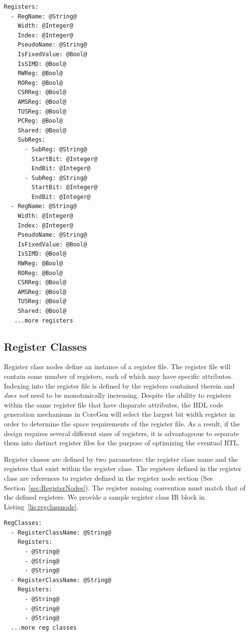 \documentclass{article}
\begin{document}
\clearpage
\vspace{0.125in}
\begin{lstlisting}[frame=single,style=base,caption={Register Node Definition},captionpos=b,label={lis:registernode}]
Registers:
  - RegName: @String@
    Width: @Integer@
    Index: @Integer@
    PseudoName: @String@
    IsFixedValue: @Bool@
    IsSIMD: @Bool@
    RWReg: @Bool@
    ROReg: @Bool@
    CSRReg: @Bool@
    AMSReg: @Bool@
    TUSReg: @Bool@
    PCReg: @Bool@
    Shared: @Bool@
    SubRegs:
      - SubReg: @String@
        StartBit: @Integer@
        EndBit: @Integer@
      - SubReg: @String@
        StartBit: @Integer@
        EndBit: @Integer@
  - RegName: @String@
    Width: @Integer@
    Index: @Integer@
    PseudoName: @String@
    IsFixedValue: @Bool@
    IsSIMD: @Bool@
    RWReg: @Bool@
    ROReg: @Bool@
    CSRReg: @Bool@
    AMSReg: @Bool@
    TUSReg: @Bool@
    Shared: @Bool@
   ...more registers
\end{lstlisting}  

\clearpage
\subsection{Register Classes}
\label{sec:RegisterClassNodes}

Register class nodes define an instance of a register file.  The register file will contain some number of registers, each of 
which may have specific attributes.  Indexing into the register file is defined by the registers contained therein and \textit{does not} 
need to be monotonically increasing.  Despite the ability to registers within the same register file that have disparate attributes, 
the HDL code generation mechanisms in CoreGen will select the largest bit width register in order to determine the space requirements 
of the register file.  As a result, if the design requires several different sizes of registers, it is advantageous to separate them into distinct 
register files for the purpose of optimizing the eventual RTL.  

Register classes are defined by two parameters: the register class name and the registers that exist within the register class.  The registers 
defined in the register class are references to register defined in the register node section (See Section~\ref{sec:RegisterNodes}).   The 
register naming convention must match that of the defined registers.  We provide a sample register class 
IR block in Listing~\ref{lis:regclassnode}. 

\vspace{0.125in}
\begin{lstlisting}[frame=single,style=base,caption={Register Class Node Definition},captionpos=b,label={lis:regclassnode}]
RegClasses:
  - RegisterClassName: @String@
    Registers:
      - @String@
      - @String@
      - @String@
  - RegisterClassName: @String@
    Registers:
      - @String@
      - @String@
      - @String@
  ...more reg classes
\end{lstlisting} 
\end{document}
